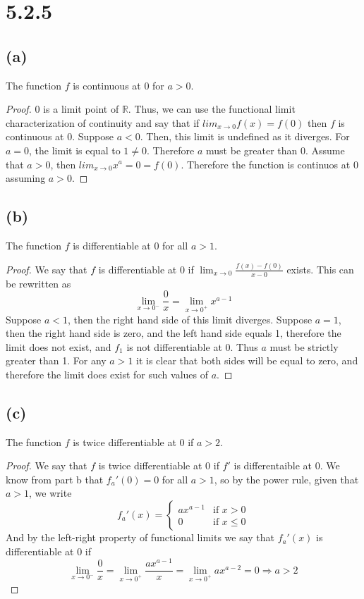\documentclass{article}
\begin{document}
\section*{5.2.5}
\subsection*{(a)}
The function $f$ is continuous at 0 for $a > 0$.
\begin{proof}
0 is a limit point of $\mathbb{R}$. Thus, we can use the functional limit characterization of continuity and say that if $lim_{x \rightarrow 0}f(x) = f(0)$ then $f$ is continuous at 0. Suppose $a < 0$. Then, this limit is undefined as it diverges. For $a=0$, the limit is equal to $1 \neq 0$. Therefore $a$ must be greater than 0. Assume that $a > 0$, then $lim_{x \rightarrow 0}x^a = 0 = f(0)$. Therefore the function is continuos at $0$ assuming $a > 0$.
\end{proof}

\subsection*{(b)}
The function $f$ is differentiable at 0 for all $a >1$.
\begin{proof}
We say that $f$ is differentiable at 0 if $\lim_{x \rightarrow 0} \frac{f(x) - f(0)}{x - 0}$ exists. This can be rewritten as
\[  \lim_{x \rightarrow 0^-}\frac{0}{x}= \lim_{x \rightarrow 0^+} x^{a-1} \]
Suppose $a < 1$, then the right hand side of this limit diverges. Suppose $a = 1$, then the right hand side is zero, and the left hand side equals 1, therefore the limit does not exist, and $f_1$ is not differentiable at 0. Thus $a$ must be strictly greater than 1. For any $a > 1$ it is clear that both sides will be equal to zero, and therefore the limit does exist for such values of $a$.
\end{proof}

\subsection*{(c)}
The function $f$ is twice differentiable at 0 if $a>2$.
\begin{proof}
We say that $f$ is twice differentiable at 0 if $f'$ is differentaible at 0. We know from part b that $f_a'(0) = 0$ for all $a>1$, so by the power rule, given that $a>1$, we write
   \[ \displaystyle f_a'(x) = \begin{cases}
     ax^{a-1} & \text{if $x >0$} \\ 
     0& \text{if $x \leqslant 0$} 
     \end{cases}\]
And by the left-right property of functional limits we say that $f_a'(x)$ is differentiable at 0 if 
\[  \lim_{x \rightarrow 0^-}\frac{0}{x}= \lim_{x \rightarrow 0^+} \frac{ax^{a-1}}{x} =\lim_{x \rightarrow 0^+} ax^{a-2}   = 0 \Longrightarrow a > 2 \]
\end{proof}
\end{document}
